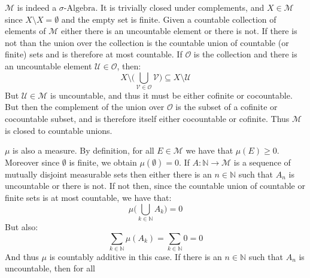 \documentclass[crop=false,class=article]{standalone}                           %
\begin{document}
        \begin{solution}
            $\mathcal{M}$ is indeed a $\sigma\textrm{-Algebra}$. It is trivially
            closed under complements, and $X\in\mathcal{M}$ since
            $X\setminus{X}=\emptyset$ and the empty set is finite. Given a
            countable collection of elements of $\mathcal{M}$ either there is an
            uncountable element or there is not. If there is not than the union
            over the collection is the countable union of countable (or finite)
            sets and is therefore at most countable. If $\mathcal{O}$ is the
            collection and there is an uncountable element
            $\mathcal{U}\in\mathcal{O}$, then:
            \begin{equation}
                X\setminus\Big(
                    \bigcup_{\mathcal{V}\in\mathcal{O}}\mathcal{V}
                \Big)
                \subseteq{X}\setminus\mathcal{U}
            \end{equation}
            But $\mathcal{U}\in\mathcal{M}$ is uncountable, and thus it must
            be either cofinite or cocountable. But then the complement of the
            union over $\mathcal{O}$ is the subset of a cofinite or cocountable
            subset, and is therefore itself either cocountable or cofinite. Thus
            $\mathcal{M}$ is closed to countable unions.
            \par\hfill\par
            $\mu$ is also a measure. By definition, for all $E\in\mathcal{M}$
            we have that $\mu(E)\geq{0}$. Moreover since $\emptyset$ is finite,
            we obtain $\mu(\emptyset)=0$. If
            $A:\mathbb{N}\rightarrow\mathcal{M}$ is a sequence of mutually
            disjoint measurable sets then either there is an $n\in\mathbb{N}$
            such that $A_{n}$ is uncountable or there is not. If not then, since
            the countable union of countable or finite sets is at most
            countable, we have that:
            \begin{equation}
                \mu\Big(\bigcup_{k\in\mathbb{N}}A_{k}\Big)=0
            \end{equation}
            But also:
            \begin{equation}
                \sum_{k\in\mathbb{N}}\mu(A_{k})=\sum_{k\in\mathbb{N}}0=0
            \end{equation}
            And thus $\mu$ is countably additive in this case. If there is an
            $n\in\mathbb{N}$ such that $A_{n}$ is uncountable, then for all

\end{solution}
\end{document}
